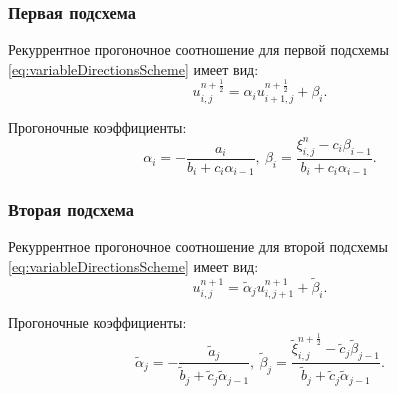 \documentclass[12pt, a4paper]{report}
\begin{document}
	\subsubsection*{Первая подсхема}
	\large
	Рекуррентное прогоночное соотношение для первой подсхемы \eqref{eq:variableDirectionsScheme} имеет вид:
	\begin{equation*}
		u_{i, j}^{n+\frac{1}{2}} = \alpha_{i}u_{i+1, j}^{n+\frac{1}{2}} + \beta_{i}.
	\end{equation*}
	\par
	Прогоночные коэффициенты:
	\begin{equation*}
		\alpha_{i} = -\frac{a_{i}}{b_{i} + c_{i}\alpha_{i-1}}, \> \beta_{i} = \frac{\xi_{i, j}^{n} - c_{i}\beta_{i-1}}{b_{i} + c_{i}\alpha_{i-1}}.
	\end{equation*}
	\subsubsection*{Вторая подсхема}
	\large
	Рекуррентное прогоночное соотношение для второй подсхемы \eqref{eq:variableDirectionsScheme} имеет вид:
	\begin{equation*}
		u_{i, j}^{n+1} = \tilde{\alpha}_{j}u_{i, j+1}^{n+1} + \tilde{\beta}_{i}.
	\end{equation*}
	\par
	Прогоночные коэффициенты:
	\begin{equation*}
		\tilde{\alpha}_{j} = -\frac{\tilde{a}_{j}}{\tilde{b}_{j} + \tilde{c}_{j}\tilde{\alpha}_{j-1}}, \> \tilde{\beta}_{j} = \frac{\tilde{\xi}_{i, j}^{n+\frac{1}{2}} - \tilde{c}_{j}\tilde{\beta}_{j-1}}{\tilde{b}_{j} + \tilde{c}_{j}\tilde{\alpha}_{j-1}}.
	\end{equation*}
\end{document}
